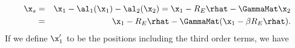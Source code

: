 \begin{eqnarray}
\label{eqn:backgroundorder2}
\x_s &=& \x_1 - \al_1(\x_1) - \al_2(\x_2) = \x_1 - R_E \rhat-  \GammaMat \x_2 \nonumber\\
&=& \x_1 - R_E \rhat -  \GammaMat (\x_1 - \beta R_E \rhat).
\end{eqnarray}
If we define $\x_1'$ to be the positions including the third order terms, we have
  
  
  
  
  